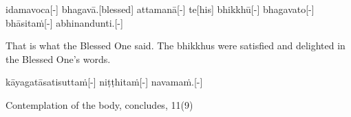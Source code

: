 \begin{samepage}
\begingl[glneveryline={\PaliGlossA,\PaliGlossB}]
idamavoca[-] bhagavā.[blessed] attamanā[-] te[his] bhikkhū[-] bhagavato[-] bhāsitaṁ[-] abhinandunti.[-]
\endgl
\nopagebreak
\linespread{0.5}
\begin{spacin}{0.2}
{\PaliGlossFT That is what the Blessed One said. The bhikkhus were satisfied and delighted in the Blessed One’s words.}
\end{spacin}
\vskip 12pt
\end{samepage}
\begin{samepage}
\begingl[glneveryline={\PaliGlossA,\PaliGlossB}]
kāyagatāsatisuttaṁ[-] niṭṭhitaṁ[-] navamaṁ.[-]
\endgl
\nopagebreak
\linespread{0.5}
\begin{spacin}{0.2}
{\PaliGlossFT Contemplation of the body, concludes, 11(9)}
\end{spacin}
\vskip 12pt
\end{samepage}